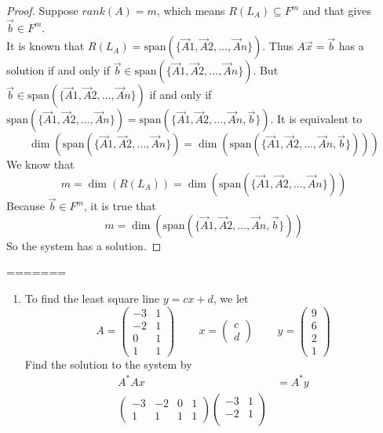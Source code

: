 \begin{homeworkProblem}
\begin{proof}
    Suppose $rank(A) = m$, which means $R(L_A) \subseteq F^{m}$ and that gives $
    \vec{b} \in F^m$.
    \\
    It is known that $R(L_A) = \text{span}(\{\vec{A}1, \vec{A}2, ..., \vec{A}n\})$. Thus $A\vec{x} = \vec{b}$ has a solution if and only if $\vec{b} \in \text{span}(\{\vec{A}1, \vec{A}2, ..., \vec{A}n\})$. But $\vec{b} \in \text{span}(\{\vec{A}1, \vec{A}2, ..., \vec{A}n\})$ if and only if $\text{span}(\{\vec{A}1, \vec{A}2, ..., \vec{A}n\}) = \text{span}(\{\vec{A}1, \vec{A}2, ..., \vec{A}n, \vec{b}\})$. It is equivalent to \[
    \dim(\text{span}(\{\vec{A}1, \vec{A}2, ..., \vec{A}n\}) = \dim(\text{span}(\{\vec{A}1, \vec{A}2, ..., \vec{A}n, \vec{b}\})))
    \]
    We know that \[
    m = \dim(R(L_A)) = \dim(\text{span}(\{\vec{A}1, \vec{A}2, ..., \vec{A}n\}))
    \]
    Because $\vec{b} \in F^{m}$, it is true that \[
    m = \dim(\text{span}(\{\vec{A}1, \vec{A}2, ..., \vec{A}n, \vec{b}\}))
    \]
    So the system has a solution.
\end{proof}
=======
\solution
\begin{enumerate}[label=(\roman*)]
    \item To find the least square line $y = cx + d$, we let \[
    A = \begin{pmatrix}
        -3 & 1 \\
        -2 & 1 \\
        0 & 1 \\
        1 & 1
    \end{pmatrix}
    \quad \, \quad
    x = \begin{pmatrix}
        c \\
        d
    \end{pmatrix}
    \quad \, \quad
    y = \begin{pmatrix}
        9 \\
        6 \\
        2 \\
        1
    \end{pmatrix}
    \]Find the solution to the system by \[
    \begin{aligned}
        A^* Ax &= A^* y\\
        \begin{pmatrix}
            -3 & -2 & 0 & 1\\
            1 & 1 & 1 & 1
        \end{pmatrix}
        \begin{pmatrix}
            -3 & 1 \\
            -2 & 1 \\

\end{pmatrix}
\end{aligned}\]
\end{enumerate}
\end{homeworkProblem}
